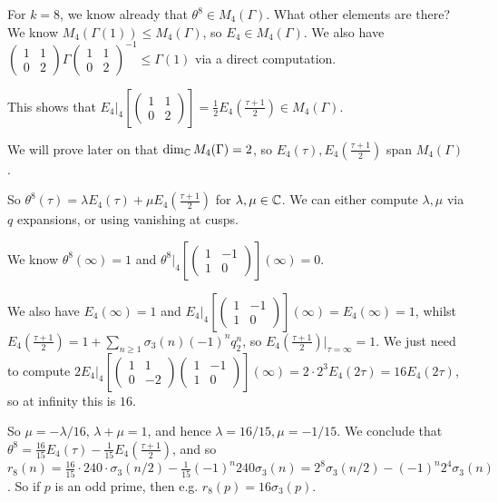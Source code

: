 \documentclass[10pt,a4paper]{article}
\begin{document}
For $k=8$, we know already that $\theta^8 \in M_4(\Gamma)$. What other elements are there? We know $M_4(\Gamma(1)) \leq M_4(\Gamma)$, so $E_4 \in M_4(\Gamma)$. We also have $\begin{pmatrix}1&1\\0&2\end{pmatrix} \Gamma \begin{pmatrix}1&1\\0&2\end{pmatrix}^{-1} \leq \Gamma(1)$ via a direct computation.

This shows that $E_4|_4\left[\begin{pmatrix}1&1\\0&2\end{pmatrix}\right] = \frac12 E_4(\frac{\tau+1}{2}) \in M_4(\Gamma)$.

We will prove later on that $\dim_{\mathbb{C}} M_4(\Gamma) = 2$, so $E_4(\tau), E_4(\frac{\tau+1}{2})$ span $M_4(\Gamma)$.

So $\theta^8(\tau) = \lambda E_4(\tau) + \mu E_4(\frac{\tau+1}{2})$ for $\lambda, \mu \in \mathbb{C}$. We can either compute $\lambda, \mu$ via $q$ expansions, or using vanishing at cusps.

We know $\theta^8(\infty) = 1$ and $\theta^8|_4\left[\begin{pmatrix}1&-1\\1&0\end{pmatrix}\right](\infty) = 0$.

We also have $E_4(\infty) = 1$ and $E_4|_4\left[\begin{pmatrix}1&-1\\1&0\end{pmatrix}\right](\infty) = E_4(\infty) = 1$, whilst $E_4(\frac{\tau+1}{2}) = 1+\sum_{n \geq 1}\sigma_3(n)(-1)^n q_2^n$, so $E_4(\frac{\tau+1}{2})|_{\tau=\infty} = 1$. We just need to compute $2E_4|_4\left[\begin{pmatrix}1&1\\0&-2\end{pmatrix}\begin{pmatrix}1&-1\\1&0\end{pmatrix}\right](\infty) = 2\cdot2^3 E_4(2\tau) = 16E_4(2\tau)$, so at infinity this is $16$.

So $\mu = -\lambda/16$, $\lambda+\mu = 1$, and hence $\lambda = 16/15, \mu = -1/15$. We conclude that $\theta^8 = \frac{16}{15}E_4(\tau) - \frac{1}{15}E_4(\frac{\tau+1}{2})$, and so $r_8(n) = \frac{16}{15}\cdot 240 \cdot \sigma_3(n/2) - \frac{1}{15}(-1)^n 240 \sigma_3(n) = 2^8 \sigma_3(n/2) - (-1)^n 2^4 \sigma_3(n)$. So if $p$ is an odd prime, then e.g. $r_8(p) = 16\sigma_3(p)$.
\end{document}
